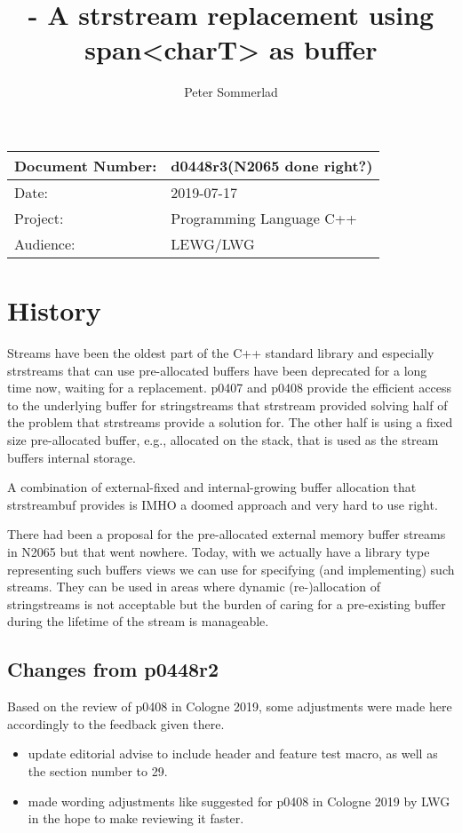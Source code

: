 \documentclass[ebook,11pt,article]{memoir}
\title{\papernumber{} - A strstream replacement using span\textless{}charT\textgreater{} as buffer}
\author{Peter Sommerlad}
\date{\paperdate}                %
\newcommand{\papernumber}{d0448r3}
\newcommand{\paperdate}{2019-07-17}
\begin{document}
\maketitle
\begin{center}
\begin{tabular}[t]{|l|l|}\hline 
Document Number:&  \papernumber \hfill (N2065 done right?)\\\hline
Date: & \paperdate \\\hline
Project: & Programming Language C++\\\hline 
Audience: & LEWG/LWG\\\hline
\end{tabular}
\end{center}
\chapter{History}
Streams have been the oldest part of the C++ standard library and especially strstreams that can use pre-allocated buffers have been deprecated for a long time now, waiting for a replacement. p0407 and p0408 provide the efficient access to the underlying buffer for stringstreams that strstream provided solving half of the problem that strstreams provide a solution for. The other half is using a fixed size pre-allocated buffer, e.g., allocated on the stack, that is used as the stream buffers internal storage.

A combination of external-fixed and internal-growing buffer allocation that strstreambuf provides is IMHO a doomed approach and very hard to use right.

There had been a proposal for the pre-allocated external memory buffer streams in N2065 but that went nowhere. Today, with  we actually have a library type representing such buffers views we can use for specifying (and implementing) such streams. They can be used in areas where dynamic (re-)allocation of stringstreams is not acceptable but the burden of caring for a pre-existing buffer during the lifetime of the stream is manageable. 

\section{Changes from p0448r2}
Based on the review of p0408 in Cologne 2019, some adjustments were made here accordingly to the feedback given there.
\begin{itemize}
\item update editorial advise to include header and feature test macro, as well as the section number to 29.
\item made wording adjustments like suggested for p0408 in Cologne 2019 by LWG in the hope to make reviewing it faster.
\end{itemize}
\end{document}
